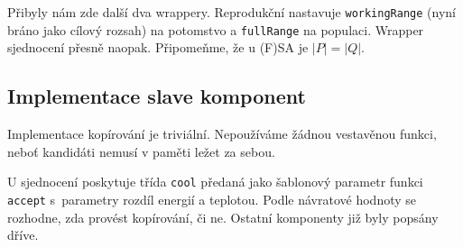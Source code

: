 Přibyly nám zde další dva wrappery. Reprodukční nastavuje \texttt{workingRange} (nyní bráno jako cílový rozsah) na potomstvo a \texttt{fullRange} na populaci. Wrapper sjednocení přesně naopak. Připomeňme, že u (F)SA je $|P|=|Q|$.

\subsection{Implementace slave komponent}

Implementace kopírování je triviální. Nepoužíváme žádnou vestavěnou funkci, neboť kandidáti nemusí v paměti ležet za sebou.

U sjednocení poskytuje třída \texttt{cool} předaná jako šablonový parametr funkci \texttt{accept} s~parametry rozdíl energií a teplotou. Podle návratové hodnoty se rozhodne, zda provést kopírování, či ne. Ostatní komponenty již byly popsány dříve.

